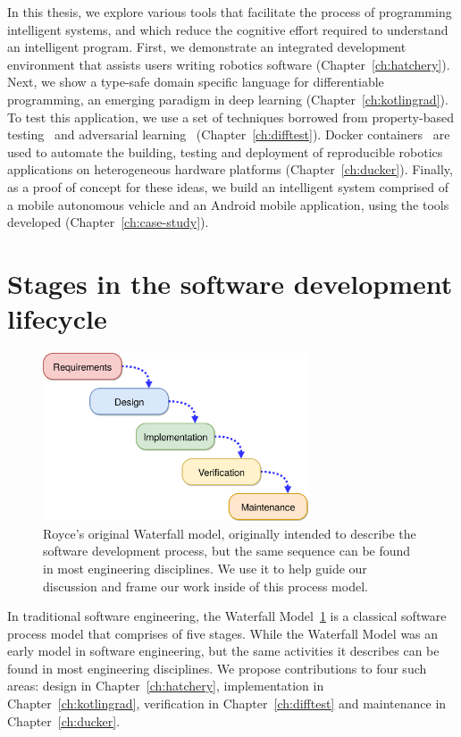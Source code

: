 \documentclass[12pt,initial,twoside,maitrise]{dms}
\numberwithin{equation}{section}
\numberwithin{table}{chapter}
\numberwithin{figure}{chapter}
\begin{document}
In this thesis, we explore various tools that facilitate the process of programming intelligent systems, and which reduce the cognitive effort required to understand an intelligent program. First, we demonstrate an integrated development environment that assists users writing robotics software (Chapter~\ref{ch:hatchery}). Next, we show a type-safe domain specific language for differentiable programming, an emerging paradigm in deep learning (Chapter~\ref{ch:kotlingrad}). To test this application, we use a set of techniques borrowed from property-based testing~\cite{fink1997property} and adversarial learning~\cite{lowd2005adversarial} (Chapter~\ref{ch:difftest}). Docker containers~\cite{merkel2014docker} are used to automate the building, testing and deployment of reproducible robotics applications on heterogeneous hardware platforms (Chapter~\ref{ch:ducker}). Finally, as a proof of concept for these ideas, we build an intelligent system comprised of a mobile autonomous vehicle and an Android mobile application, using the tools developed (Chapter~\ref{ch:case-study}).

\section{Stages in the software development lifecycle}\label{sec:sldc-stages}

\begin{figure}
    \centering
    \includegraphics[width=0.70\textwidth]{waterfall_diagram.png}
    \caption{Royce's original Waterfall model, originally intended to describe the software development process, but the same sequence can be found in most engineering disciplines. We use it to help guide our discussion and frame our work inside of this process model.\vspace{-10}}
    \label{fig:waterfall_model}
\end{figure}

In traditional software engineering, the Waterfall Model~\ref{fig:waterfall_model} is a classical software process model that comprises of five stages. While the Waterfall Model was an early model in software engineering, but the same activities it describes can be found in most engineering disciplines. We propose contributions to four such areas: design in Chapter~\ref{ch:hatchery}, implementation in Chapter~\ref{ch:kotlingrad}, verification in Chapter~\ref{ch:difftest} and maintenance in Chapter~\ref{ch:ducker}.
\end{document}
